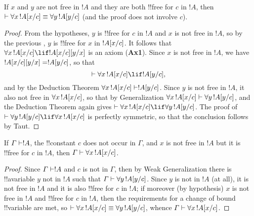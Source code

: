 \documentclass[../../../include/open-logic-section]{subfiles}
\begin{document}
\begin{lem}
If $x$ and $y$ are not free in $!A$ and they are both !!{free for} $c$
in $!A$, then $\Proves \lforall[x][\Subst{!A}{x}{c}] \equiv
\lforall[y][\Subst{!A}{y}{c}]$ (and the proof does not involve $c$).
\end{lem}

\begin{proof} 
From the hypotheses, $y$ is !!{free for} $c$ in $!A$ and $x$ is not
free in $!A$, so by the previous , $y$ is
!!{free for} $x$ in $!A[x/c]$. It follows that
$\lforall[x][\Subst{!A}{x}{c} \lif \Subst{!A}{x}{c} \Subst{}{y}{x}]$
is an axiom (\textbf{Ax1}). Since $x$ is not free in $!A$, we have
$!A[x/c] [y/x] = !A[y/c]$, so that 
\[
\Proves \lforall[x][\Subst{!A}{x}{c}] \lif \Subst{!A}{y}{c}, 
\] 
and by the Deduction Theorem $\lforall[x][\Subst{!A}{x}{c}] \Proves
\Subst{!A}{y}{c}$. Since $y$ is not free in $!A$, it also not free in
$\lforall[x][\Subst{!A}{x}{c}]$, so that by Generalization
$\lforall[x][\Subst{!A}{x}{c}] \Proves \lforall[y][\Subst{!A}{y}{c}]$,
and the Deduction Theorem again gives $\Proves
\lforall[x][\Subst{!A}{x}{c}] \lif \lforall[y][\Subst{!A}{y}{c}]$.
The proof of $\Proves \lforall[y][\Subst{!A}{y}{c}] \lif \lforall[x]
[\Subst{!A}{x}{c}]$ is perfectly symmetric, so that the conclusion
follows by Taut.
\end{proof}

\begin{thm}
If $\Gamma \Proves !A$, the !!{constant} $c$ does not occur in
$\Gamma$, and $x$ is not free in $!A$ but it is !!{free for} $c$ in $!A$,
then $\Gamma \Proves \lforall[x][\Subst{!A}{x}{c}]$. 
\end{thm}

\begin{proof} 
Since $\Gamma \Proves !A$ and $c$ is not in $\Gamma$, then by
Weak Generalization there is !!a{variable} $y$ not in $!A$ such that
$\Gamma \Proves \lforall[y][\Subst{!A}{y}{c}]$. Since $y$ is not in $!A$
(at all), it is not free in $!A$ and it is also !!{free for} $c$ in $!A$;
if moreover (by hypothesis) $x$ is not free in $!A$ and !!{free for} $c$ in
$!A$, then the requirements for a change of bound !!{variable} are met, so
$\Proves \lforall[x][\Subst{!A}{x}{c}] \equiv
\lforall[y][\Subst{!A}{y}{c}]$, whence $\Gamma \Proves
\lforall[x][\Subst{!A}{x}{c}]$. 
\end{proof}
\end{document}
